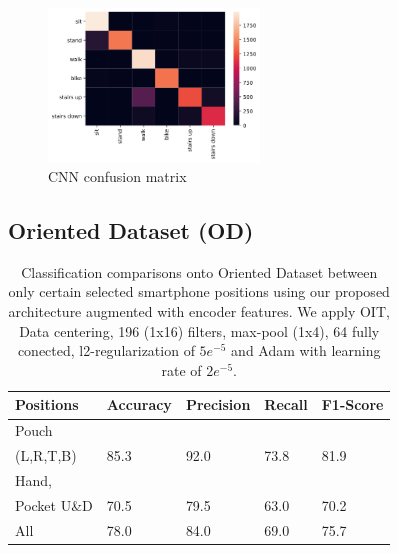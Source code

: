 \begin{figure}[h]
	\centering
	\includegraphics[width=0.5\textwidth]{images/confusion_matrix.png}
	\caption{CNN confusion matrix}
	\label{fig:cnn-confusion-matrix}
\end{figure}


\subsection{Oriented Dataset (OD)}




\begin{table}[t]
	\begin{center}
		\begin{tabular}{ p{1.8cm}p{1.2cm}p{1.2cm}p{0.9cm}p{1.4cm}}
			\hline
			Positions & Accuracy & Precision & Recall & F1-Score \\
			\hline
			Pouch \\(L,R,T,B) & 85.3 & 92.0 & 73.8 & 81.9 \\
			\hline
			Hand, \\ Pocket U\&D & 70.5 & 79.5 & 63.0 & 70.2 \\
			\hline
			All & 78.0 & 84.0 & 69.0 & 75.7 \\
			\hline
		\end{tabular}
		\caption{\label{tab:model-performance} Classification comparisons onto Oriented Dataset between only certain selected smartphone positions using our proposed architecture augmented with encoder features. We apply OIT, Data centering, 196 (1x16) filters, max-pool (1x4), 64 fully conected, l2-regularization of $5e^{-5}$ and Adam with learning rate of $2e^{-5}$. }
	\end{center}
\end{table}


